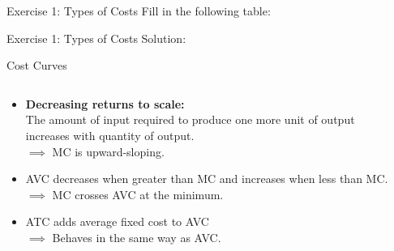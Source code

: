 \documentclass[9pt]{beamer}
\begin{document}
\begin{frame}{Exercise 1: Types of Costs}
    Fill in the following table: 
    
\end{frame}

\begin{frame}{Exercise 1: Types of Costs}
    Solution: 
    
\end{frame}

\begin{frame}{Cost Curves}
\begin{columns}[c]
    \begin{column}{0.5\textwidth}
        \begin{itemize}
            \item<1-> \textbf{Decreasing returns to scale:}\\
            The amount of input required to produce one more unit of output increases with quantity of output.\\
            $\implies$ MC is upward-sloping.
            \vspace{5pt}
            \item<2-> AVC decreases when greater than MC and increases when less than MC.\\
            $\implies$ MC crosses AVC at the minimum.
            \vspace{5pt}
            \item<3-> ATC adds average fixed cost to AVC\\
            $\implies$ Behaves in the same way as AVC.
        \end{itemize}
    \end{column}
    \begin{column}{0.5\textwidth}

\end{column}
\end{columns}
\end{frame}
\end{document}
